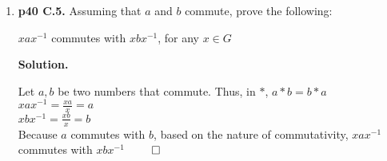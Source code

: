 \documentclass[11pt]{article}
\begin{document}
\begin{enumerate}
\item {\bfseries p40 C.5.}
  Assuming that $a$ and $b$ commute, prove the following:
  
  $xax^{-1}$ commutes with $xbx^{-1}$, for any $x \in G$
  
  {\bfseries Solution.}
  
  Let $a,b$ be two numbers that commute. Thus, in $*$, $a*b = b*a$\\
  $xax^{-1} = \frac{xa}{x} = a$\\
  $xbx^{-1} = \frac{xb}{x} = b$\\
  Because $a$ commutes with $b$, based on the nature of commutativity, $xax^{-1}$ commutes with $xbx^{-1}$ $\qed$\\


\end{enumerate}
\end{document}

